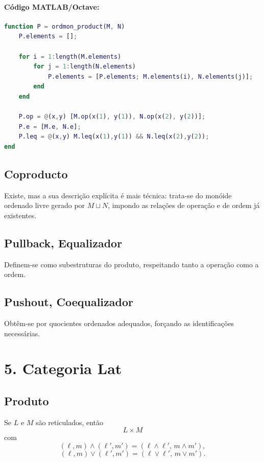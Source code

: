 \documentclass[a4paper,12pt]{article}
\begin{document}
\paragraph{Código MATLAB/Octave:}
\begin{lstlisting}[language=Matlab]
function P = ordmon_product(M, N)
    P.elements = [];
    
    for i = 1:length(M.elements)
        for j = 1:length(N.elements)
            P.elements = [P.elements; M.elements(i), N.elements(j)];
        end
    end
    
    P.op = @(x,y) [M.op(x(1), y(1)), N.op(x(2), y(2))];
    P.e = [M.e, N.e];
    P.leq = @(x,y) M.leq(x(1),y(1)) && N.leq(x(2),y(2));
end
\end{lstlisting}

\subsection*{Coproducto}

Existe, mas a sua descrição explícita é mais técnica: trata-se do monóide
ordenado livre gerado por $M\sqcup N$, impondo as relações de operação e de
ordem já existentes.

\subsection*{Pullback, Equalizador}

Definem-se como subestruturas do produto, respeitando tanto a operação como a
ordem.

\subsection*{Pushout, Coequalizador}

Obtêm-se por quocientes ordenados adequados, forçando as identificações
necessárias.

\section*{5. Categoria \(\mathbf{Lat}\)}

\subsection*{Produto}

Se $L$ e $M$ são reticulados, então
\[
L\times M
\]
com
\[
(\ell,m)\wedge(\ell',m')=(\ell\wedge\ell',\, m\wedge m'),
\]
\[
(\ell,m)\vee(\ell',m')=(\ell\vee\ell',\, m\vee m').
\]
\end{document}
